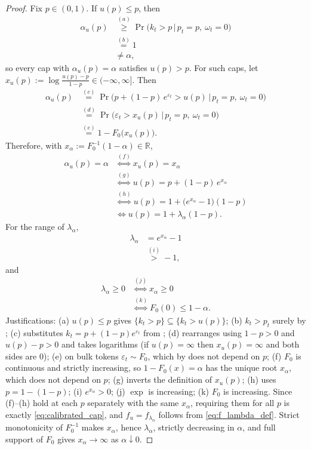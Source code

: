 \begin{proof}
Fix $p\in(0,1)$. If $u(p)\le p$, then
\begin{align*}
\alpha_u(p)
&\overset{(a)}{\ge} \Pr\big(k_t>p\,\big|\,p_t=p,\ \omega_t=0\big)\\
&\overset{(b)}{=} 1\\
&\neq \alpha ,
\end{align*}
so every cap with $\alpha_u(p)=\alpha$ satisfies $u(p)>p$. For such caps, let
$x_u(p):=\log\frac{u(p)-p}{1-p}\in(-\infty,\infty]$. Then
\begin{align*}
\alpha_u(p)
&\overset{(c)}{=} \Pr\big(p+(1-p)\,e^{\varepsilon_t}>u(p)\,\big|\,p_t=p,\ \omega_t=0\big)\\
&\overset{(d)}{=} \Pr\big(\varepsilon_t>x_u(p)\,\big|\,p_t=p,\ \omega_t=0\big)\\
&\overset{(e)}{=} 1-F_0\big(x_u(p)\big).
\end{align*}
Therefore, with $x_\alpha:=F_0^{-1}(1-\alpha)\in\mathbb R$,
\begin{align*}
\alpha_u(p)=\alpha
&\overset{(f)}{\iff} x_u(p)=x_\alpha\\
&\overset{(g)}{\iff} u(p)=p+(1-p)\,e^{x_\alpha}\\
&\overset{(h)}{\iff} u(p)=1+\big(e^{x_\alpha}-1\big)(1-p)\\
&\iff u(p)=1+\lambda_\alpha(1-p).
\end{align*}
For the range of $\lambda_\alpha$,
\begin{align*}
\lambda_\alpha
&= e^{x_\alpha}-1\\
&\overset{(i)}{>} -1,
\end{align*}
and
\begin{align*}
\lambda_\alpha\ge0
&\overset{(j)}{\iff} x_\alpha\ge0\\
&\overset{(k)}{\iff} F_0(0)\le1-\alpha .
\end{align*}
Justifications: (a) $u(p)\le p$ gives $\{k_t>p\}\subseteq\{k_t>u(p)\}$;
(b) $k_t>p_t$ surely by ; (c) substitutes
$k_t=p+(1-p)e^{\varepsilon_t}$ from ; (d) rearranges
using $1-p>0$ and $u(p)-p>0$ and takes logarithms (if $u(p)=\infty$ then
$x_u(p)=\infty$ and both sides are $0$); (e) on bulk tokens
$\varepsilon_t\sim F_0$, which by  does not
depend on $p$; (f) $F_0$ is continuous and strictly increasing, so
$1-F_0(x)=\alpha$ has the unique root $x_\alpha$, which does not depend on
$p$; (g) inverts the definition of $x_u(p)$; (h) uses $p=1-(1-p)$; (i)
$e^{x_\alpha}>0$; (j) $\exp$ is increasing; (k) $F_0$ is increasing. Since
(f)--(h) hold at each $p$ separately with the same $x_\alpha$, requiring them
for all $p$ is exactly \eqref{eq:calibrated_cap}, and $f_u=f_{\lambda_\alpha}$
follows from \eqref{eq:f_lambda_def}. Strict monotonicity of $F_0^{-1}$ makes
$x_\alpha$, hence $\lambda_\alpha$, strictly decreasing in $\alpha$, and full
support of $F_0$ gives $x_\alpha\to\infty$ as $\alpha\downarrow0$.
\end{proof}

